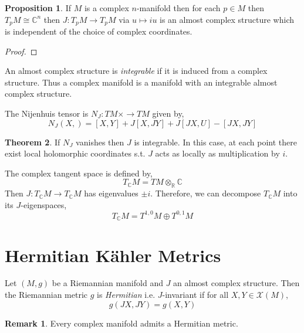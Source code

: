 \documentclass[12pt]{extarticle}
\newcommand{\R}{\mathbb{R}}
\newcommand{\C}{\mathbb{C}}
\theoremstyle{definition}
\newtheorem{theorem}{Theorem}[section]
\newtheorem{proposition}[theorem]{Proposition}
\newtheorem{remark}{Remark}
\newenvironment{definition}[1][Definition:]{\begin{trivlist}
\item[\hskip \labelsep {\bfseries #1}]}{\end{trivlist}}
\begin{document}
\begin{proposition}
If $M$ is a complex $n$-manifold then for each $p \in M$ then $T_p M \cong \C^{n}$ then $J : T_p M \to T_p M$ via $u \mapsto i u$ is an almost complex structure which is independent of the choice of complex coordinates.
\end{proposition}

\begin{proof}

\end{proof}

\begin{definition}
An almost complex structure is \textit{integrable} if it is induced from a complex structure. Thus a complex manifold is a manifold with an integrable almost complex structure. 
\end{definition}

\begin{definition} 
The Nijenhuis tensor is $N_J : TM \times \to TM$ given by,
\[ N_J(X, ) = [X, Y] + J[X, JY] + J[JX, U] - [JX, JY] \]
\end{definition}

\begin{theorem}
If $N_J$ vanishes then $J$ is integrable. In this case, at each point there exist local holomorphic coordinates s.t. $J$ acts as locally as multiplication by $i$. 
\end{theorem}

\begin{definition}
The complex tangent space is defined by,
\[ T_\C M = TM \otimes_{\R} \C \]
Then $J : T_\C M \to T_\C M$ has eigenvalues $\pm i$. Therefore, we can decompose $T_\C M$ into its $J$-eigenspaces,
\[ T_\C M = T^{1,0} M \oplus T^{0, 1} M \]
\end{definition}

\section{Hermitian K\"{a}hler Metrics}

\begin{definition}
Let $(M, g)$ be a Riemannian manifold and $J$ an almost complex structure. Then the Riemannian metric $g$ is \textit{Hermitian} i.e. $J$-invariant if for all $X, Y \in \mathscr{X}(M)$,
\[ g(J X, J Y) = g(X, Y) \] 
\end{definition}

\begin{remark}
Every complex manifold admits a Hermitian metric.
\end{remark}
\end{document}
